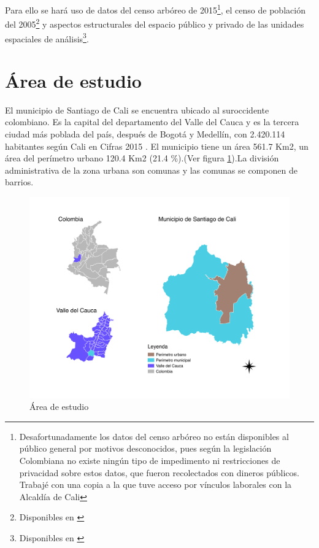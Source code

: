 \documentclass[12pt,]{book}
\let\rmarkdownfootnote\footnote%
\def\footnote{\protect\rmarkdownfootnote}
\begin{document}
Para ello se hará uso de datos del censo arbóreo de 2015\footnote{Desafortunadamente
  los datos del censo arbóreo no están disponibles al público general
  por motivos desconocidos, pues según la legislación Colombiana no
  existe ningún tipo de impedimento ni restricciones de privacidad sobre
  estos datos, que fueron recolectados con dineros públicos. Trabajé con
  una copia a la que tuve acceso por vínculos laborales con la Alcaldía
  de Cali}, el censo de población del 2005\footnote{Disponibles en
  \citep{censo_sistema_dane, dane_cepal_celade_2005, geoportal_DANE}} y
aspectos estructurales del espacio público y privado de las unidades
espaciales de análisis\footnote{Disponibles en
  \citep{geoportal_idesc, noauthor_plan_nodate}}.

\section{Área de estudio}\label{area-de-estudio}

El municipio de Santiago de Cali se encuentra ubicado al suroccidente
colombiano. Es la capital del departamento del Valle del Cauca y es la
tercera ciudad más poblada del país, después de Bogotá y Medellín, con
2.420.114 habitantes según Cali en Cifras 2015\citep{escobar2015cali} .
El municipio tiene un área 561.7 Km2, un área del perímetro urbano 120.4
Km2 (21.4 \%).(Ver figura \ref{fig:ubicacion}).La división
administrativa de la zona urbana son comunas y las comunas se componen
de barrios.

\begin{figure}
\includegraphics[width=1\linewidth]{QGIS/mapas/ubicacion_cali2} \caption{Área de estudio}\label{fig:ubicacion}
\end{figure}
\end{document}
